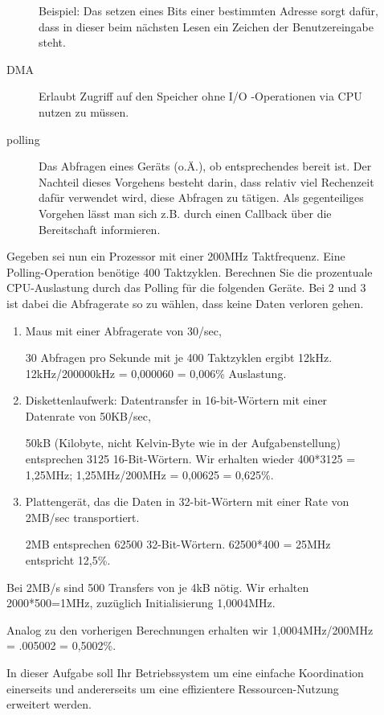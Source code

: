 \begin{description}
\begin{description}
        Beispiel: Das setzen eines Bits einer bestimmten Adresse sorgt dafür, dass in dieser beim nächsten Lesen ein Zeichen der Benutzereingabe steht.
      \item[DMA]
        Erlaubt Zugriff auf den Speicher ohne I/O -Operationen via CPU nutzen zu müssen.
      \item[polling] Das Abfragen eines Geräts (o.Ä.), ob entsprechendes bereit ist.
        Der Nachteil dieses Vorgehens besteht darin, dass relativ viel Rechenzeit dafür verwendet wird, diese Abfragen zu tätigen. Als gegenteiliges Vorgehen lässt man sich z.B. durch einen Callback über die Bereitschaft informieren.
    \end{description}

Gegeben sei nun ein Prozessor mit einer 200MHz Taktfrequenz. Eine Polling-Operation 
benötige 400 Taktzyklen. Berechnen Sie die prozentuale CPU-Auslastung durch das Polling für die folgenden Geräte. Bei 2 und 3 ist dabei die Abfragerate so zu wählen, dass keine Daten verloren gehen. 
    \begin{enumerate}[label=\arabic*.]
      \item Maus mit einer Abfragerate von 30/sec, 

        30 Abfragen pro Sekunde mit je 400 Taktzyklen ergibt 12kHz. 12kHz/200000kHz = 0,000060 = 0,006\% Auslastung.
      \item Diskettenlaufwerk: Datentransfer in 16-bit-Wörtern mit einer Datenrate von 50KB/sec, 

        50kB (Kilobyte, nicht Kelvin-Byte wie in der Aufgabenstellung) entsprechen 3125 16-Bit-Wörtern. Wir erhalten wieder 400*3125 = 1,25MHz; 1,25MHz/200MHz = 0,00625 = 0,625\%.
      \item Plattengerät, das die Daten in 32-bit-Wörtern mit einer Rate von 2MB/sec transportiert. 

        2MB entsprechen 62500 32-Bit-Wörtern. 62500*400 = 25MHz entspricht 12,5\%.
    \end{enumerate}

    Bei 2MB/s sind 500 Transfers von je 4kB nötig.
    Wir erhalten 2000*500=1MHz, zuzüglich Initialisierung 1,0004MHz.

    Analog zu den vorherigen Berechnungen erhalten wir 1,0004MHz/200MHz = .005002 = 0,5002\%.


In dieser Aufgabe soll Ihr Betriebssystem um eine einfache Koordination einerseits und 
andererseits um eine effizientere Ressourcen-Nutzung erweitert werden. 


\end{description}
